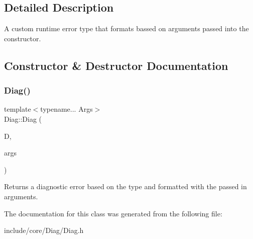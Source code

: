 \subsection{Detailed Description}
A custom runtime error type that formats bassed on arguments passed into the constructor. 

\subsection{Constructor \& Destructor Documentation}
\mbox{\label{class_diag_a33c4f75aee9e099724ac86e5ddfc16b9}} 
\subsubsection{\texorpdfstring{Diag()}{Diag()}}
{\footnotesize\ttfamily template$<$typename... Args$>$ \\
Diag\+::\+Diag (\begin{DoxyParamCaption}\item[{Diag\+Type\+::\+Diag\+Type}]{D,  }\item[{Args \&\&...}]{args }\end{DoxyParamCaption})\hspace{0.3cm}{\ttfamily [inline]}}

Returns a diagnostic error based on the type and formatted with the passed in arguments. 

The documentation for this class was generated from the following file\+:\begin{DoxyCompactItemize}
\item 
include/core/\+Diag/Diag.\+h\end{DoxyCompactItemize}
